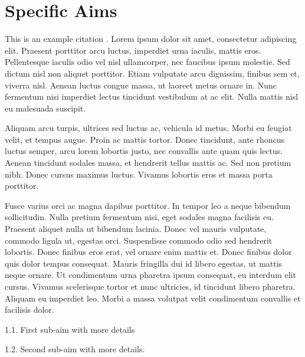 \documentclass[11pt, notitlepage]{article} %
\begin{document}

\section*{Specific Aims}

This is an example citation \cite{baraniukCompressiveSensingLecture2007}. Lorem ipsum dolor sit amet, consectetur adipiscing elit. Praesent porttitor arcu luctus, imperdiet urna iaculis, mattis eros. Pellentesque iaculis odio vel nisl ullamcorper, nec faucibus ipsum molestie. Sed dictum nisl non aliquet porttitor. Etiam vulputate arcu dignissim, finibus sem et, viverra nisl. Aenean luctus congue massa, ut laoreet metus ornare in. Nunc fermentum nisi imperdiet lectus tincidunt vestibulum at ac elit. Nulla mattis nisl eu malesuada suscipit.

Aliquam arcu turpis, ultrices sed luctus ac, vehicula id metus. Morbi eu feugiat velit, et tempus augue. Proin ac mattis tortor. Donec tincidunt, ante rhoncus luctus semper, arcu lorem lobortis justo, nec convallis ante quam quis lectus. Aenean tincidunt sodales massa, et hendrerit tellus mattis ac. Sed non pretium nibh. Donec cursus maximus luctus. Vivamus lobortis eros et massa porta porttitor.

Fusce varius orci ac magna dapibus porttitor. In tempor leo a neque bibendum sollicitudin. Nulla pretium fermentum nisi, eget sodales magna facilisis eu. Praesent aliquet nulla ut bibendum lacinia. Donec vel mauris vulputate, commodo ligula ut, egestas orci. Suspendisse commodo odio sed hendrerit lobortis. Donec finibus eros erat, vel ornare enim mattis et. Donec finibus dolor quis dolor tempus consequat. Mauris fringilla dui id libero egestas, ut mattis neque ornare. Ut condimentum urna pharetra ipsum consequat, eu interdum elit cursus. Vivamus scelerisque tortor et nunc ultricies, id tincidunt libero pharetra. Aliquam eu imperdiet leo. Morbi a massa volutpat velit condimentum convallis et facilisis dolor.

\begin{description}
	\item[Aim 1: Really cool stuff.]{}
	\item{1.1. First sub-aim with more details}
	\item{1.2. Second sub-aim with more details.}  
\end{description}
\end{document}
